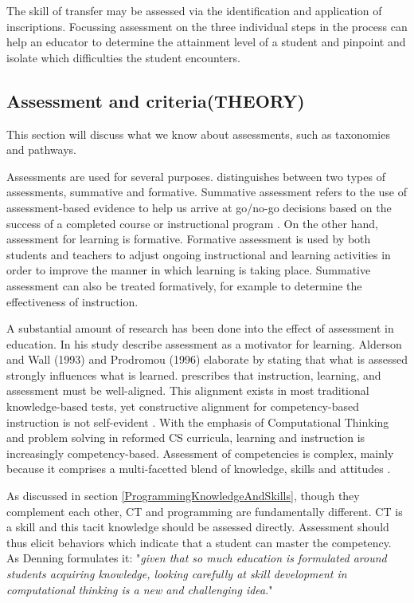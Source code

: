 The skill of transfer may be assessed via the identification and application of inscriptions. Focussing assessment on the three individual steps in the process can help an educator to determine the attainment level of a student and pinpoint and isolate which difficulties the student encounters.





\subsection{Assessment and criteria(THEORY)}
This section will discuss what we know about assessments, such as taxonomies and pathways.


Assessments are used for several purposes.  distinguishes between two types of assessments, summative and formative. Summative assessment refers to the use of assessment-based evidence to help us arrive at go/no-go decisions based on the success of a completed course or instructional program \cite{popham2009assessment}. On the other hand, assessment for learning is formative. Formative assessment is used by both students and teachers to adjust ongoing instructional and learning activities in order to improve the manner in which learning is taking place. Summative assessment can also be treated formatively, for example to determine the effectiveness of instruction.




A substantial amount of research has been done into the effect of assessment in education. In his study \citeauthor{frederiksen1984} describe assessment as a motivator for learning. Alderson and Wall (1993) and Prodromou (1996) elaborate by stating that what is assessed strongly influences what is learned.  prescribes that instruction, learning, and assessment must be well-aligned. This alignment exists in most traditional knowledge-based tests, yet constructive alignment for competency-based instruction is not self-evident \cite{baartman2006wheel}. With the emphasis of Computational Thinking and problem solving in reformed CS curricula, learning and instruction is increasingly competency-based. Assessment of competencies is complex, mainly because it comprises a multi-facetted blend of knowledge, skills and attitudes \cite{merrienboer2002competenties}.


As discussed in section \ref{ProgrammingKnowledgeAndSkills}, though they complement each other, CT and programming are fundamentally different. CT is a skill and this tacit knowledge should be assessed directly\cite{denning2017remaining}. Assessment should thus elicit behaviors which indicate that a student can master the competency. As Denning formulates it: "\emph{given that so much education is formulated around students acquiring knowledge, looking carefully at skill development in computational thinking is a new and challenging idea}."\cite{denning2017remaining}


